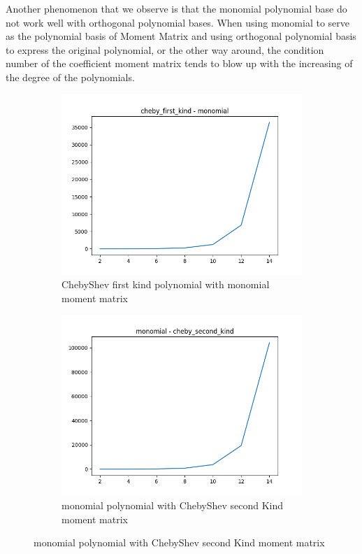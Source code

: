 \documentclass[12pt]{amsart}
\numberwithin{equation}{section}
\theoremstyle{definition}
\numberwithin{thm}{section}
\begin{document}
Another phenomenon that we observe is that the monomial polynomial base do not work well
with orthogonal polynomial bases. When using monomial to serve as the polynomial basis of Moment Matrix
and using orthogonal polynomial basis to express the original polynomial,
or the other way around, 
the condition number of the coefficient moment matrix tends 
to blow up with the increasing of the degree of the polynomials.

\begin{figure}[hbt!]
     \centering
     \begin{subfigure}[b]{0.475\textwidth}
         \centering
         \includegraphics[width=\textwidth]{imgs/cheby_first_kind_monomial.png}
         \caption[ChebyShev First Kind polynomial with monomial moment matrix]%
         {\small ChebyShev first kind polynomial with monomial moment matrix}%

     \end{subfigure}
     \hfill
     \begin{subfigure}[b]{0.475\textwidth}  
         \centering 
         \includegraphics[width=\textwidth]{imgs/monomial_cheby_second_kind.png}
         \caption[monomial polynomial with ChebyShev second Kind moment matrix]%
         {\small monomial polynomial with ChebyShev second Kind moment matrix}%
 

\end{subfigure}
\end{figure}
\end{document}
